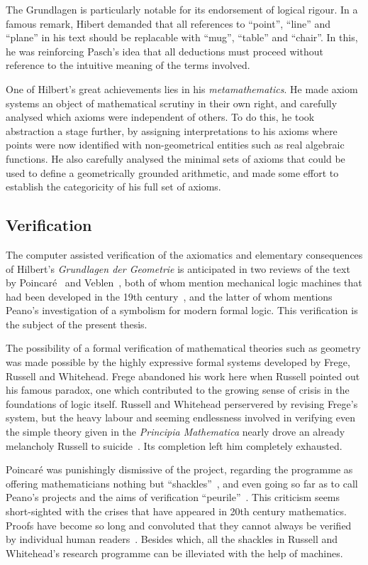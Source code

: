The Grundlagen is particularly notable for its endorsement of logical rigour. In a famous remark, Hibert demanded that all references to ``point'', ``line'' and ``plane'' in his text should be replacable with ``mug'', ``table'' and ``chair''. In this, he was reinforcing Pasch's idea that all deductions must proceed without reference to the intuitive meaning of the terms involved.

One of Hilbert's great achievements lies in his \emph{metamathematics}. He made axiom systems an object of mathematical scrutiny in their own right, and carefully analysed which axioms were independent of others. To do this, he took abstraction a stage further, by assigning interpretations to his axioms where points were now identified with non-geometrical entities such as real algebraic functions. He also carefully analysed the minimal sets of axioms that could be used to define a geometrically grounded arithmetic, and made some effort to establish the categoricity of his full set of axioms.

\subsection{Verification}
The computer assisted verification of the axiomatics and elementary consequences of Hilbert's \emph{Grundlagen der Geometrie} is anticipated in two reviews of the text by Poincar\'{e}~\cite{PoincareReview} and Veblen~\cite{VeblenHilbertReview}, both of whom mention mechanical logic machines that had been developed in the 19th century~\cite{LogicMachines}, and the latter of whom mentions Peano's investigation of a symbolism for modern formal logic. This verification is the subject of the present thesis.

The possibility of a formal verification of mathematical theories such as geometry was made possible by the highly expressive formal systems developed by Frege, Russell and Whitehead. Frege abandoned his work here when Russell pointed out his famous paradox, one which contributed to the growing sense of crisis in the foundations of logic itself. Russell and Whitehead perservered by revising Frege's system, but the heavy labour and seeming endlessness involved in verifying even the simple theory given in the \emph{Principia Mathematica} nearly drove an already melancholy Russell to suicide~\cite{RussellSuicide}. Its completion left him completely exhausted.

Poincar\'{e} was punishingly dismissive of the project, regarding the programme as offering mathematicians nothing but ``shackles''~\cite{PoincareShackles}, and even going so far as to call Peano's projects and the aims of verification ``peurile''~\cite{PoincareReview}. This criticism seems short-sighted with the crises that have appeared in 20th century mathematics. Proofs have become so long and convoluted that they cannot always be verified by individual human readers~\cite{WhitherMathematics}. Besides which, all the shackles in Russell and Whitehead's research programme can be illeviated with the help of machines.

